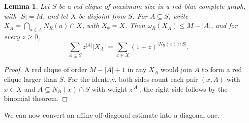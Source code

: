 \documentclass[11pt]{article}
\newtheorem{lemma}[theorem]{Lemma}
\theoremstyle{definition}
\theoremstyle{remark}
\numberwithin{equation}{section}
\begin{document}
\begin{lemma}\label{lem:spines}
Let $S$ be a red clique of maximum size in a red--blue complete graph, with $|S|=M$, and let $X$ be disjoint from $S$. For $A\subseteq S$, write $X_A=\bigcap_{a\in A}N_R(a)\cap X$, with $X_\emptyset=X$. Then
$\omega_R(X_A)\le M-|A|$, and for every $z\ge0$,
\[
 \sum_{A\subseteq S}z^{|A|}|X_A|
 =\sum_{x\in X}(1+z)^{|N_R(x)\cap S|}.
\]
\end{lemma}
\begin{proof}
A red clique of order $M-|A|+1$ in any $X_A$ would join $A$ to form a red clique larger than $S$. For the identity, both sides count each pair $(x,A)$ with $x\in X$ and $A\subseteq N_R(x)\cap S$ with weight $z^{|A|}$; the right side follows by the binomial theorem.
\end{proof}

We can now convert an affine off-diagonal estimate into a diagonal one.
\end{document}
